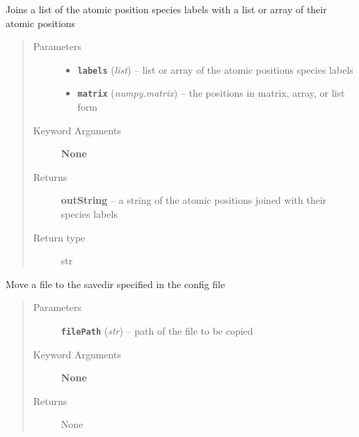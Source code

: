 \documentclass[letterpaper,10pt,english]{sphinxmanual}
\begin{document}
\begin{fulllineitems}
\label{retr:retr.__joinMatrixLabels}
Joins a list of the atomic position species labels with a list or array of their atomic positions
\begin{quote}\begin{description}
\item[{Parameters}] \leavevmode\begin{itemize}
\item {} 
\textbf{\texttt{labels}} (\emph{list}) -- list or array of the atomic positions species labels

\item {} 
\textbf{\texttt{matrix}} (\emph{numpy.matrix}) -- the positions in matrix, array, or list form

\end{itemize}

\item[{Keyword Arguments}] \leavevmode
\textbf{None}

\item[{Returns}] \leavevmode
\textbf{outString} --
a string of the atomic positions joined with their species labels

\item[{Return type}] \leavevmode
str

\end{description}\end{quote}

\end{fulllineitems}


\begin{fulllineitems}
\label{retr:retr.__moveToSavedir}
Move a file to the savedir specified in the config file
\begin{quote}\begin{description}
\item[{Parameters}] \leavevmode
\textbf{\texttt{filePath}} (\emph{str}) -- path of the file to be copied

\item[{Keyword Arguments}] \leavevmode
\textbf{None}

\item[{Returns}] \leavevmode
None

\end{description}\end{quote}

\end{fulllineitems}
\end{document}

